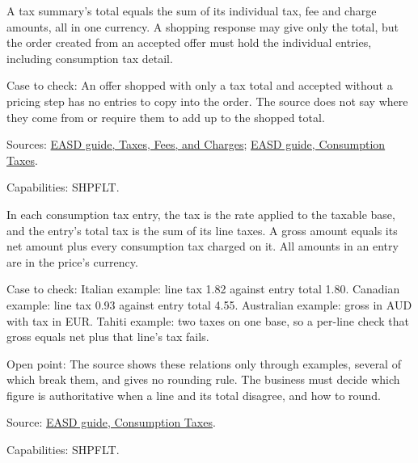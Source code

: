 \begin{theorem}
  \label{thm:offers-tax-summary-total}
  A tax summary's total equals the sum of its individual tax, fee and charge
  amounts, all in one currency. A shopping response may give only the total,
  but the order created from an accepted offer must hold the individual
  entries, including consumption tax detail.

  Case to check: An offer shopped with only a tax total and accepted without
  a pricing step has no entries to copy into the order. The source does not
  say where they come from or require them to add up to the shopped total.

  Sources: \href{https://standards.atlassian.net/wiki/spaces/EASD/pages/574455915/Taxes+Fees+and+Charges}{EASD guide, Taxes, Fees, and Charges};
  \href{https://standards.atlassian.net/wiki/spaces/EASD/pages/2588377182/Consumption+Taxes}{EASD guide, Consumption Taxes}.

  Capabilities: SHPFLT.
\end{theorem}

\begin{theorem}
  \label{thm:offers-consumption-tax-lines}
  \notready
  In each consumption tax entry, the tax is the rate applied to the taxable
  base, and the entry's total tax is the sum of its line taxes. A gross
  amount equals its net amount plus every consumption tax charged on it. All
  amounts in an entry are in the price's currency.

  Case to check: Italian example: line tax 1.82 against entry total 1.80.
  Canadian example: line tax 0.93 against entry total 4.55. Australian
  example: gross in AUD with tax in EUR. Tahiti example: two taxes on one
  base, so a per-line check that gross equals net plus that line's tax
  fails.

  Open point: The source shows these relations only through examples,
  several of which break them, and gives no rounding rule. The business must
  decide which figure is authoritative when a line and its total disagree,
  and how to round.

  Source: \href{https://standards.atlassian.net/wiki/spaces/EASD/pages/2588377182/Consumption+Taxes}{EASD guide, Consumption Taxes}.

  Capabilities: SHPFLT.
\end{theorem}


